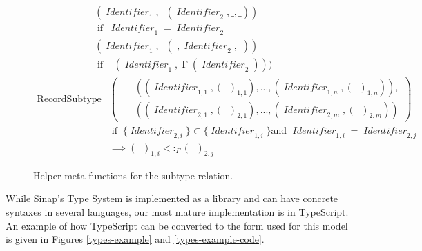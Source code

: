 \documentclass[12pt]{article}
\DeclareMathOperator{\RecT}{RecT_\Gamma}
\DeclareMathOperator{\ObjT}{ObjT_\Gamma}
\DeclareMathOperator{\LookupObjRef}{\Gamma}
\DeclareMathOperator{\Identifier}{\textit{Identifier}}
\DeclareMathOperator{\Type}{{\textit{Type}_\Gamma}}
\DeclareMathOperator{\ObjectSubtype}{ObjectSubtype_\Gamma}
\DeclareMathOperator{\RecordSubtype}{RecordSubtype}
\DeclareMathOperator{\textif}{ if }
\newcommand{\subtype}{<:_\Gamma}
\begin{document}
\begin{figure}
\begin{mdframed}        
\begin{align*}
    \ObjectSubtype&(\Identifier_1, \ObjT(\Identifier_2,\_, \_)) \\&\textif 
    \; \Identifier_1 = \Identifier_2\\
    \ObjectSubtype&(\Identifier_1, \ObjT(\_,\Identifier_2, \_)) \\&\textif 
    \;\ObjectSubtype(\Identifier_1, \LookupObjRef(\Identifier_2)))
\end{align*}
\begin{align*}
    \RecordSubtype &\left(\begin{aligned}
        &\RecT((\Identifier_{1,1}, (\Type)_{1, 1}), ..., (\Identifier_{1,n}, (\Type)_{1, n})), \\
        &\RecT((\Identifier_{2,1}, (\Type)_{2, 1}), ..., (\Identifier_{2,m}, (\Type)_{2, m}))
    \end{aligned}\right) \\
    &\textif\; \{\Identifier_{2,i}\} \subset \{\Identifier_{1,i}\}
    \text{and } \Identifier_{1, i} = \Identifier_{2, j} \\&\implies (\Type)_{1, i} \subtype (\Type)_{2, j}
\end{align*}
\end{mdframed}        
    \caption{Helper meta-functions for the subtype relation.}
\label{subtype-helpers}
\end{figure}

While Sinap's Type System is implemented as a library and can have 
concrete syntaxes in several languages, our most mature implementation 
is in TypeScript. An example of how TypeScript can be converted to 
the form used for this model is given in 
Figures \ref{types-example} and \ref{types-example-code}. 
\end{document}
